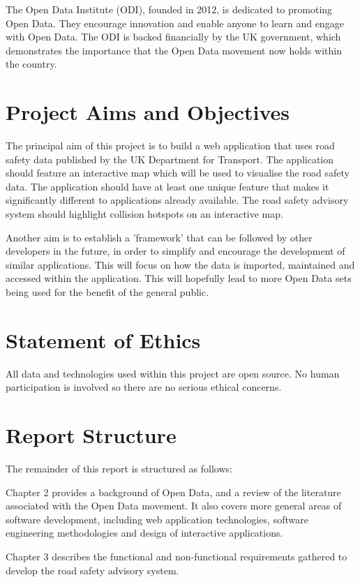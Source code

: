 \documentclass[authoryearcitations]{UoYCSproject}
\begin{document}
The Open Data Institute (ODI), founded in 2012, is dedicated to promoting Open Data. They encourage innovation and enable anyone to learn and engage with Open Data. The ODI is backed financially by the UK government, which demonstrates the importance that the Open Data movement now holds within the country.

\section{Project Aims and Objectives}

The principal aim of this project is to build a web application that uses road safety data published by the UK Department for Transport. The application should feature an interactive map which will be used to visualise the road safety data. The application should have at least one unique feature that makes it significantly different to applications already available. The road safety advisory system should highlight collision hotspots on an interactive map.

Another aim is to establish a 'framework' that can be followed by other developers in the future, in order to simplify and encourage the development of similar applications. This will focus on how the data is imported, maintained and accessed within the application. This will hopefully lead to more Open Data sets being used for the benefit of the general public.

\section{Statement of Ethics}
All data and technologies used within this project are open source. No human participation is involved so there are no serious ethical concerns.

\section{Report Structure}
The remainder of this report is structured as follows:

Chapter 2 provides a background of Open Data, and a review of the literature associated with the Open Data movement. It also covers more general areas of software development, including web application technologies, software engineering methodologies and design of interactive applications.

Chapter 3 describes the functional and non-functional requirements gathered to develop the road safety advisory system.
\end{document}
